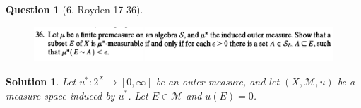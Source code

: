 \documentclass{article} %
\theoremstyle{quest}
\newtheorem*{question}{Question}
\newtheorem*{solution}{Solution}
\begin{document}
\newpage

\begin{question}[6. Royden 17-36]
\hfill
\begin{figure}[h!]
  \centering
    \includegraphics[width=1\textwidth]{17-36.png}
\end{figure}
\end{question}
\begin{solution}
Let $u^*:2^X \to [0,\infty]$ be an outer-measure, and let
$(X,\mathscr{M},u)$ be a measure space induced by $u^*$. Let $E \in 
\mathscr{M}$ and $u(E) = 0$. 

\end{solution}
\end{document}
